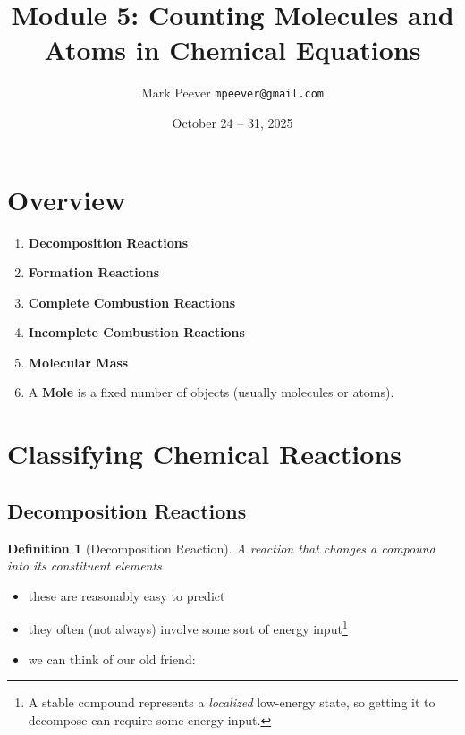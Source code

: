 \documentclass[11pt, oneside]{article}   	%
\title{Module 5: Counting Molecules and Atoms in Chemical Equations }
\author{Mark Peever \texttt{mpeever@gmail.com}}
\date{October 24 -- 31, 2025}
\newtheorem{definition}{Definition}
\begin{document}
\maketitle

\begin{center}

\end{center}

\section{Overview}
\begin{enumerate}
\item \textbf{Decomposition Reactions} 
\item \textbf{Formation Reactions}
\item \textbf{Complete Combustion Reactions}
\item \textbf{Incomplete Combustion Reactions}
\item \textbf{Molecular Mass}
\item A \textbf{Mole} is a fixed number of objects (usually molecules or atoms).
\end{enumerate}

\section{Classifying Chemical Reactions}

\subsection{Decomposition Reactions}

\begin{definition}[Decomposition Reaction]\label{defn:reaction:decomposition}
A reaction that changes a compound into its constituent elements
\end{definition}

\begin{itemize}
\item these are reasonably easy to predict
\item they often (not always) involve some sort of energy input\footnote{A stable compound represents a \emph{localized} low-energy state, so getting it to decompose can require some energy input.}
\item we can think of our old friend: 
\end{itemize} 
\end{document}
